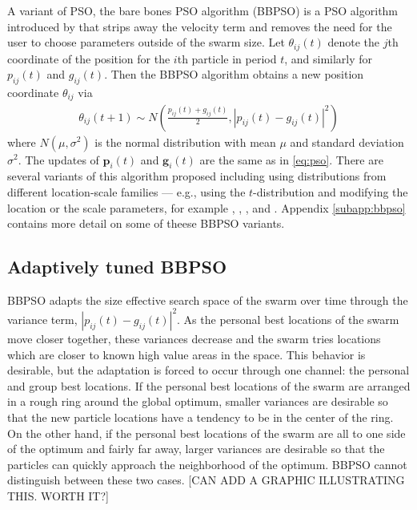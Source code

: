 \documentclass[12pt]{article}
\begin{document}
A variant of PSO, the bare bones PSO algorithm (BBPSO) is a PSO algorithm introduced by \citet{kennedy2003bare} that strips away the velocity term and removes the need for the user to choose parameters outside of the swarm size. Let $\theta_{ij}(t)$ denote the $j$th coordinate of the position for the $i$th particle in period $t$, and similarly for $p_{ij}(t)$ and $g_{ij}(t)$. Then the BBPSO algorithm obtains a new position coordinate $\theta_{ij}$ via
\begin{align}\label{eq:bbpso}
\theta_{ij}(t+1) \sim N\left(\frac{p_{ij}(t) + g_{ij}(t)}{2}, |p_{ij}(t) - g_{ij}(t)|^2\right)
\end{align}
where $N(\mu,\sigma^2)$ is the normal distribution with mean $\mu$ and standard deviation $\sigma^2$. The updates of $\bm{p}_i(t)$ and $\bm{g}_i(t)$ are the same as in \eqref{eq:pso}. There are several variants of this algorithm proposed including using distributions from different location-scale families --- e.g., using the $t$-distribution and modifying the location or the scale parameters, for example \citet{krohling2009bare}, \citet{hsieh2010modified}, \citet{richer2006levy}, and \citet{campos2014bare}. Appendix \ref{subapp:bbpso} contains more detail on some of theese BBPSO variants.

\subsection{Adaptively tuned BBPSO}\label{subsec:ATBBPSO}
BBPSO adapts the size effective search space of the swarm over time through the variance term, $|p_{ij}(t) - g_{ij}(t)|^2$. As the personal best locations of the swarm move closer together, these variances decrease and the swarm tries locations which are closer to known high value areas in the space. This behavior is desirable, but the adaptation is forced to occur through one channel: the personal and group best locations. If the personal best locations of the swarm are arranged in a rough ring around the global optimum, smaller variances are desirable so that the new particle locations have a tendency to be in the center of the ring. On the other hand, if the personal best locations of the swarm are all to one side of the optimum and fairly far away, larger variances are desirable so that the particles can quickly approach the neighborhood of the optimum. BBPSO cannot distinguish between these two cases. [CAN ADD A GRAPHIC ILLUSTRATING THIS. WORTH IT?] 
\end{document}
